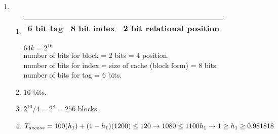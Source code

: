\documentclass[12pt]{article}
\begin{document}
\begin{enumerate}
    \item \mbox{}

        \begin{enumerate}
            \item \mbox{}
                \begin{table}[h!]
                    \centering
                    \begin{tabular}{|c|c|c|}
                        \hline
                        6 bit tag & 8 bit index & 2 bit relational position\\ \hline
                    \end{tabular}
                \end{table}
                $64k=2^{16}$\\
                number of bits for block = 2 bits = 4 position.\\
                number of bits for index = size of cache (block form) = 8 bits.\\
                number of bits for tag = 6 bits.
            \item
                16 bits.
            \item
                $2^{10}/4=2^8=256$ blocks.
            \item
                $T_{access}=100(h_1)+(1-h_1)(1200) \leq 120 \to 1080 \leq 1100h_1\\
                \to 1 \geq h_1 \geq 0.981818  $

        \end{enumerate}


\end{enumerate}
\end{document}
